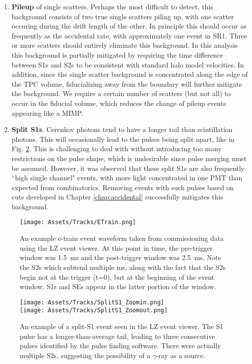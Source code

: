 \begin{enumerate}
    \item \textbf{Pileup} of single scatters. Perhaps the most difficult to detect, this background consists of two true single scatters piling up, with one scatter occuring during the drift length of the other.
    In principle this should occur as frequently as the accidental rate, with approximately one event in SR1.
    Three or more scatters should entirely eliminate this background.
    In this analysis this background is partially mitigated by requiring the time difference between S1s and S2s to be consistent with standard halo model velocities.
    In addition, since the single scatter background is concentrated along the edge of the TPC volume, fiducializing away from the boundary will further mitigate the background.
    We require a certain number of scatters (but not all) to occur in the fiducial volume, which reduces the change of pileup events appearing like a MIMP.
    \item \textbf{Split S1s}.
    Cerenkov photons tend to have a longer tail than scintillation photons.
    This will occasionally lead to the pulses being split apart, like in Fig. \ref{fig:split_s1}.
    This is challenging to deal with without introducing too many restrictions on the pulse shape, which is undesirable since pulse merging must be assumed.
    However, it was observed that these split S1s are also frequently ``high single channel" events, with more light concentrated in one PMT than expected from combinatorics. 
    Removing events with such pulses based on cuts developed in Chapter \ref{chap:accidental} successfully mitigates this background.
\end{enumerate}

\begin{figure}
    \centering
    \texttt{[image: Assets/Tracks/ETrain.png]}
    \caption[An example e-train event waveform taken from commissioning data using the LZ event viewer.]%
    {An example e-train event waveform taken from commissioning data using the LZ event viewer.
    At this point in time, the pre-trigger window was 1.5~ms and the post-trigger window was 2.5~ms.
    Note the S2s which subtend multiple ms, along with the fact that the S2s begin not at the trigger (t=0), but at the beginning of the event window.
    S1s and SEs appear in the latter portion of the window.
    }
    \label{fig:etrain}
\end{figure}

\begin{figure}
    \centering
    \texttt{[image: Assets/Tracks/SplitS1\_Zoomin.png]}\\
        \texttt{[image: Assets/Tracks/SplitS1\_Zoomout.png]}

    \caption[An example of a split-S1 event seen in the LZ event viewer. ]%
    {An example of a split-S1 event seen in the LZ event viewer. 
    The S1 pulse has a longer-than-average tail, leading to three consecutive pulses identified by the pulse finding software.
    There were actually multiple S2s, suggesting the possibility of a $\gamma$-ray as a source.}
    \label{fig:split_s1}
\end{figure}

